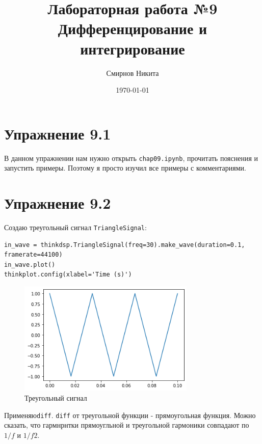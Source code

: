 \documentclass[a4paper,12pt]{report}
\title{Лабораторная работа №9\\Дифференцирование и интегрирование}
\author{Смирнов Никита}
\date{\today}
\begin{document}
\maketitle
\tableofcontents
\listoffigures
\lstlistoflistings

\maketitle

\chapter{Упражнение 9.1}

В данном упражнении нам нужно открыть \texttt{chap09.ipynb}, прочитать пояснения и  запустить примеры. Поэтому я просто изучил все примеры с комментариями.
\chapter{Упражнение 9.2}

Создаю треугольный сигнал \texttt{TriangleSignal}:

\begin{lstlisting}[caption=Создание треугольного сигнала]
in_wave = thinkdsp.TriangleSignal(freq=30).make_wave(duration=0.1, framerate=44100)
in_wave.plot()
thinkplot.config(xlabel='Time (s)')
\end{lstlisting}

\begin{figure}[H]
        \centering
        \includegraphics[width=0.75\textwidth]{1.png}
        \caption{Треугольный сигнал}
        \label{1}
\end{figure}

Применяю\texttt{diff}. \texttt{diff} от треугольной функции - прямоугольная функция. Можно сказать, что гармнрнтки прямоугльной и треугольной гармоники совпадают по $1/f$ и $1/f2$.
\end{document}
